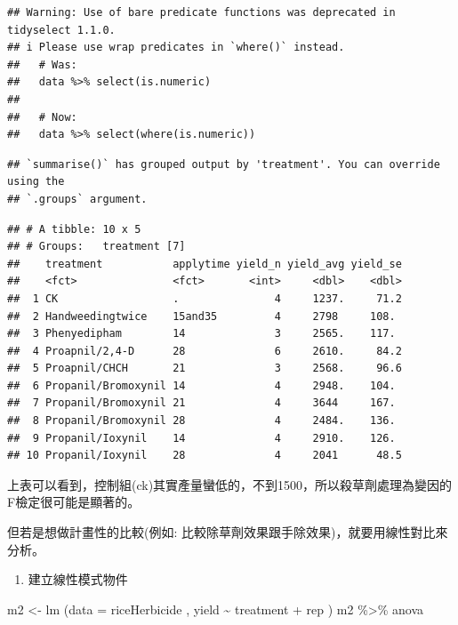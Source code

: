 \documentclass[
]{book}
\newenvironment{Shaded}{\begin{snugshade}}{\end{snugshade}}
\newcommand{\AttributeTok}[1]{\textcolor[rgb]{0.77,0.63,0.00}{#1}}
\newcommand{\FunctionTok}[1]{\textcolor[rgb]{0.00,0.00,0.00}{#1}}
\newcommand{\NormalTok}[1]{#1}
\newcommand{\OtherTok}[1]{\textcolor[rgb]{0.56,0.35,0.01}{#1}}
\newcommand{\SpecialCharTok}[1]{\textcolor[rgb]{0.00,0.00,0.00}{#1}}
\providecommand{\tightlist}{%
  \setlength{\itemsep}{0pt}\setlength{\parskip}{0pt}}
\begin{document}
\begin{verbatim}
## Warning: Use of bare predicate functions was deprecated in tidyselect 1.1.0.
## i Please use wrap predicates in `where()` instead.
##   # Was:
##   data %>% select(is.numeric)
## 
##   # Now:
##   data %>% select(where(is.numeric))
\end{verbatim}

\begin{verbatim}
## `summarise()` has grouped output by 'treatment'. You can override using the
## `.groups` argument.
\end{verbatim}

\begin{verbatim}
## # A tibble: 10 x 5
## # Groups:   treatment [7]
##    treatment           applytime yield_n yield_avg yield_se
##    <fct>               <fct>       <int>     <dbl>    <dbl>
##  1 CK                  .               4     1237.     71.2
##  2 Handweedingtwice    15and35         4     2798     108. 
##  3 Phenyedipham        14              3     2565.    117. 
##  4 Proapnil/2,4-D      28              6     2610.     84.2
##  5 Proapnil/CHCH       21              3     2568.     96.6
##  6 Propanil/Bromoxynil 14              4     2948.    104. 
##  7 Propanil/Bromoxynil 21              4     3644     167. 
##  8 Propanil/Bromoxynil 28              4     2484.    136. 
##  9 Propanil/Ioxynil    14              4     2910.    126. 
## 10 Propanil/Ioxynil    28              4     2041      48.5
\end{verbatim}

上表可以看到，控制組(ck)其實產量蠻低的，不到1500，所以殺草劑處理為變因的F檢定很可能是顯著的。

但若是想做計畫性的比較(例如: 比較除草劑效果跟手除效果)，就要用線性對比來分析。

\begin{enumerate}
\def\labelenumi{\arabic{enumi}.}
\setcounter{enumi}{1}
\tightlist
\item
  建立線性模式物件
\end{enumerate}

\begin{Shaded}
\begin{Highlighting}[]
\NormalTok{m2 }\OtherTok{\textless{}{-}} \FunctionTok{lm}\NormalTok{ (}\AttributeTok{data =}\NormalTok{ riceHerbicide , yield }\SpecialCharTok{\textasciitilde{}}\NormalTok{ treatment }\SpecialCharTok{+}\NormalTok{ rep ) }
\NormalTok{m2 }\SpecialCharTok{\%\textgreater{}\%}\NormalTok{ anova}
\end{Highlighting}
\end{Shaded}
\end{document}
